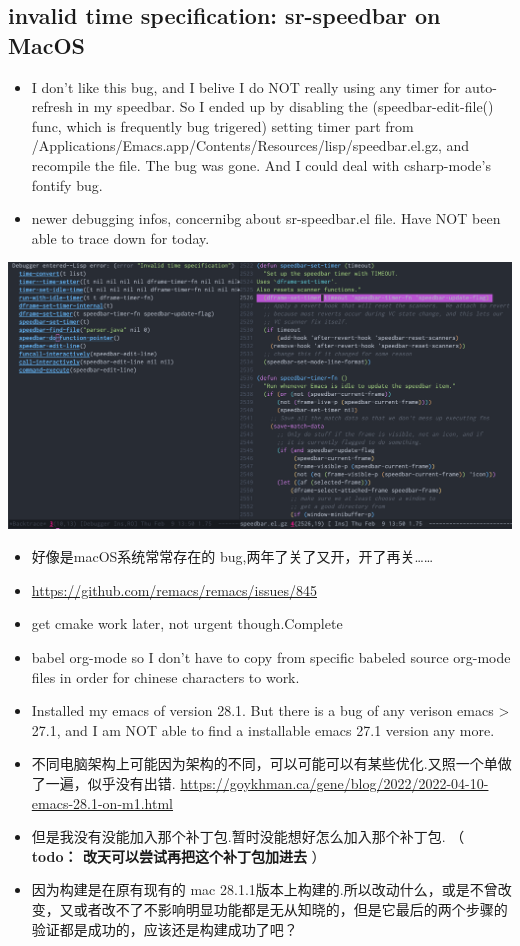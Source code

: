 \documentclass[9pt, b5paper]{article}
\begin{document}
\subsection{invalid time specification: sr-speedbar on MacOS}
\label{sec-2-2}
\begin{itemize}
\item I don't like this bug, and I belive I do NOT really using any timer for auto-refresh in my speedbar. So I ended up by disabling the (speedbar-edit-file() func, which is frequently bug trigered) setting timer part from /Applications/Emacs.app/Contents/Resources/lisp/speedbar.el.gz, and recompile the file. The bug was gone. And I could deal with csharp-mode's fontify bug.
\item newer debugging infos, concernibg about sr-speedbar.el file. Have NOT been able to trace down for today.
\end{itemize}

\includegraphics[width=.9\linewidth]{./pic/readme_20230209_135039.png}
\begin{itemize}
\item 好像是macOS系统常常存在的 bug,两年了关了又开，开了再关\ldots{}\ldots{}
\item \url{https://github.com/remacs/remacs/issues/845}
\item get cmake work later, not urgent though.Complete
\item babel org-mode so I don't have to copy from specific babeled source org-mode files in order for chinese characters to work.
\item Installed my emacs of version 28.1. But there is a bug of any verison emacs > 27.1, and I am NOT able to find a installable emacs 27.1 version any more.
\item 不同电脑架构上可能因为架构的不同，可以可能可以有某些优化.又照一个单做了一遍，似乎没有出错. \url{https://goykhman.ca/gene/blog/2022/2022-04-10-emacs-28.1-on-m1.html}
\item 但是我没有没能加入那个补丁包.暂时没能想好怎么加入那个补丁包. （ \textbf{todo： 改天可以尝试再把这个补丁包加进去} ）
\item 因为构建是在原有现有的 mac 28.1.1版本上构建的.所以改动什么，或是不曾改变，又或者改不了不影响明显功能都是无从知晓的，但是它最后的两个步骤的验证都是成功的，应该还是构建成功了吧？
\end{itemize}
\end{document}
